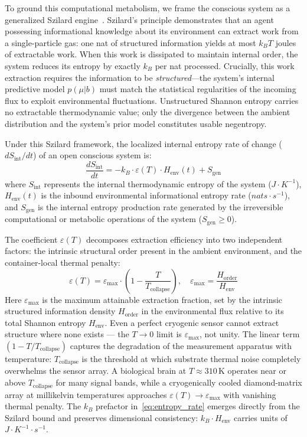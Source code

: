 \documentclass[twocolumn, 10pt, journal, letterpaper]{IEEEtran}
\begin{document}
To ground this computational metabolism, we frame the conscious system as a generalized Szilard engine~\cite{szilard1929}. Szilard's principle demonstrates that an agent possessing informational knowledge about its environment can extract work from a single-particle gas: one nat of structured information yields at most $k_B T$ joules of extractable work. When this work is dissipated to maintain internal order, the system reduces its entropy by exactly $k_B$ per nat processed. Crucially, this work extraction requires the information to be \textit{structured}---the system's internal predictive model $p(\mu|b)$ must match the statistical regularities of the incoming flux to exploit environmental fluctuations. Unstructured Shannon entropy carries no extractable thermodynamic value; only the divergence between the ambient distribution and the system's prior model constitutes usable negentropy.

Under this Szilard framework, the localized internal entropy rate of change ($dS_{\text{int}}/dt$) of an open conscious system is:
\begin{equation}
\frac{dS_{\text{int}}}{dt} = -k_B \cdot \varepsilon(T) \cdot H_{\text{env}}(t) + S_{\text{gen}}
\label{eq:entropy_rate}
\end{equation}
where $S_{\text{int}}$ represents the internal thermodynamic entropy of the system ($J \cdot K^{-1}$), $H_{\text{env}}(t)$ is the inbound environmental informational entropy rate ($nats \cdot s^{-1}$), and $S_{\text{gen}}$ is the internal entropy production rate generated by the irreversible computational or metabolic operations of the system ($S_{\text{gen}} \ge 0$). 

The coefficient $\varepsilon(T)$ decomposes extraction efficiency into two independent factors: the intrinsic structural order present in the ambient environment, and the container-local thermal penalty:
\begin{equation}
\varepsilon(T) = \varepsilon_{\max} \cdot \left(1 - \frac{T}{T_{\text{collapse}}}\right), \quad
\varepsilon_{\max} = \frac{H_{\text{order}}}{H_{\text{env}}}
\label{eq:efficiency}
\end{equation}
Here $\varepsilon_{\max}$ is the maximum attainable extraction fraction, set by the intrinsic structured information density $H_{\text{order}}$ in the environmental flux relative to its total Shannon entropy $H_{\text{env}}$. Even a perfect cryogenic sensor cannot extract structure where none exists --- the $T \to 0$ limit is $\varepsilon_{\max}$, not unity. The linear term $(1 - T/T_{\text{collapse}})$ captures the degradation of the measurement apparatus with temperature: $T_{\text{collapse}}$ is the threshold at which substrate thermal noise completely overwhelms the sensor array. A biological brain at $T \approx 310\,\text{K}$ operates near or above $T_{\text{collapse}}$ for many signal bands, while a cryogenically cooled diamond-matrix array at millikelvin temperatures approaches $\varepsilon(T) \to \varepsilon_{\max}$ with vanishing thermal penalty. The $k_B$ prefactor in~\eqref{eq:entropy_rate} emerges directly from the Szilard bound and preserves dimensional consistency: $k_B \cdot H_{\text{env}}$ carries units of $J \cdot K^{-1} \cdot s^{-1}$.
\end{document}
